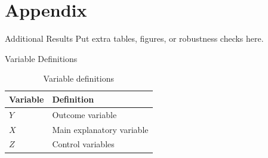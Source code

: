 \documentclass[aspectratio=169]{beamer}
\begin{document}

\appendix
\backupbegin

\section{Appendix}

\begin{frame}{Additional Results}
  Put extra tables, figures, or robustness checks here.
\end{frame}

\begin{frame}{Variable Definitions}
  \begin{table}
    \centering
    \begin{tabular}{ll}
      \toprule
      Variable & Definition \\
      \midrule
      $Y$ & Outcome variable \\
      $X$ & Main explanatory variable \\
      $Z$ & Control variables \\
      \bottomrule
    \end{tabular}
    \caption{Variable definitions}
  \end{table}
\end{frame}

\backupend
\end{document}
